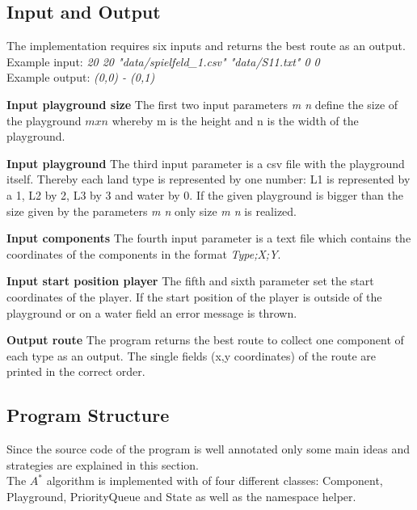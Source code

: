 \documentclass{article}
\begin{document}
\subsection{Input and Output}
The implementation requires six inputs and returns the best route as an output.\\
Example input: \textit{20 20 "data/spielfeld\_1.csv" "data/S11.txt" 0 0}\\
Example output: \textit{(0,0) - (0,1)}
\begin{description}
    \item{\textbf{Input playground size}} The first two input parameters \textit{m n} define the size of the playground $m x n$ whereby m is the height and n is the width of the playground. %
    \item{\textbf{Input playground}} The third input parameter is a csv file with the playground itself. Thereby each land type is represented by one number: L1 is represented by a 1, L2 by 2, L3 by 3 and water by 0. If the given playground is bigger than the size given by the parameters \textit{m n} only size \textit{m n} is realized.
    \item{\textbf{Input components}} The fourth input parameter is a text file which contains the coordinates of the components in the format \textit{Type;X;Y}.
    \item{\textbf{Input start position player}} The fifth and sixth parameter set the start coordinates of the player. If the start position of the player is outside of the playground or on a water field an error message is thrown.
    \item{\textbf{Output route}} The program returns the best route to collect one component of each type as an output. The single fields (x,y coordinates) of the route are printed in the correct order.
\end{description}

\subsection{Program Structure}
Since the source code of the program is well annotated only some main ideas and strategies are explained in this section.\\
The $A^*$ algorithm is implemented with of four different classes: Component, Playground, PriorityQueue and State as well as the namespace helper. 
\end{document}
